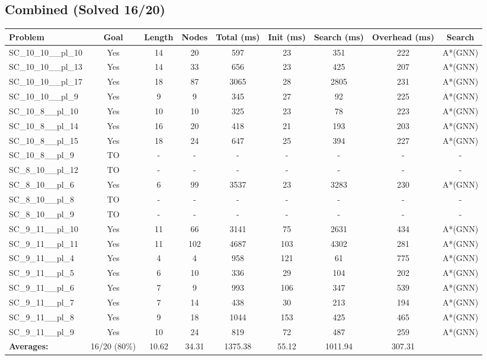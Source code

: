 \documentclass{article}
\begin{document}
\subsection*{Combined (Solved 16/20)}
\begin{tabular}{lcccccccc}
\toprule
Problem & Goal & Length & Nodes & Total (ms) & Init (ms) & Search (ms) & Overhead (ms) & Search \\
\midrule
SC\_10\_10\_\_pl\_10 & Yes & 14 & 20 & 597 & 23 & 351 & 222 & A*(GNN) \\
SC\_10\_10\_\_pl\_13 & Yes & 14 & 33 & 656 & 23 & 425 & 207 & A*(GNN) \\
SC\_10\_10\_\_pl\_17 & Yes & 18 & 87 & 3065 & 28 & 2805 & 231 & A*(GNN) \\
SC\_10\_10\_\_pl\_9 & Yes & 9 & 9 & 345 & 27 & 92 & 225 & A*(GNN) \\
SC\_10\_8\_\_pl\_10 & Yes & 10 & 10 & 325 & 23 & 78 & 223 & A*(GNN) \\
SC\_10\_8\_\_pl\_14 & Yes & 16 & 20 & 418 & 21 & 193 & 203 & A*(GNN) \\
SC\_10\_8\_\_pl\_15 & Yes & 18 & 24 & 647 & 25 & 394 & 227 & A*(GNN) \\
SC\_10\_8\_\_pl\_9 & TO & - & - & - & - & - & - & - \\
SC\_8\_10\_\_pl\_12 & TO & - & - & - & - & - & - & - \\
SC\_8\_10\_\_pl\_6 & Yes & 6 & 99 & 3537 & 23 & 3283 & 230 & A*(GNN) \\
SC\_8\_10\_\_pl\_8 & TO & - & - & - & - & - & - & - \\
SC\_8\_10\_\_pl\_9 & TO & - & - & - & - & - & - & - \\
SC\_9\_11\_\_pl\_10 & Yes & 11 & 66 & 3141 & 75 & 2631 & 434 & A*(GNN) \\
SC\_9\_11\_\_pl\_11 & Yes & 11 & 102 & 4687 & 103 & 4302 & 281 & A*(GNN) \\
SC\_9\_11\_\_pl\_4 & Yes & 4 & 4 & 958 & 121 & 61 & 775 & A*(GNN) \\
SC\_9\_11\_\_pl\_5 & Yes & 6 & 10 & 336 & 29 & 104 & 202 & A*(GNN) \\
SC\_9\_11\_\_pl\_6 & Yes & 7 & 9 & 993 & 106 & 347 & 539 & A*(GNN) \\
SC\_9\_11\_\_pl\_7 & Yes & 7 & 14 & 438 & 30 & 213 & 194 & A*(GNN) \\
SC\_9\_11\_\_pl\_8 & Yes & 9 & 18 & 1044 & 153 & 425 & 465 & A*(GNN) \\
SC\_9\_11\_\_pl\_9 & Yes & 10 & 24 & 819 & 72 & 487 & 259 & A*(GNN) \\
\textbf{Averages:} & 16/20 (80\%) & 10.62 & 34.31 & 1375.38 & 55.12 & 1011.94 & 307.31 & \\
\bottomrule
\end{tabular}
\\[0.7cm]
\end{document}
